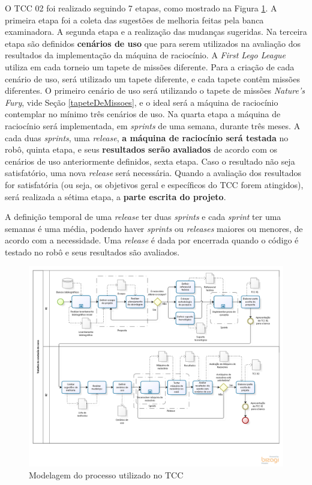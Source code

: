 O TCC 02 foi realizado seguindo 7 etapas, como mostrado na Figura \ref{modelagem}. A primeira etapa foi a coleta das sugestões de melhoria feitas pela banca examinadora. A segunda etapa e a realização das mudanças sugeridas. Na terceira etapa são definidos \textbf{cenários de uso} que para serem utilizados na avaliação dos resultados da implementação da máquina de raciocínio. 
A \textit{First Lego League} utiliza em cada torneio um tapete de missões diferente. Para a criação de cada cenário de uso, será utilizado um tapete diferente, e cada tapete contêm  missões diferentes. O primeiro cenário de uso será utilizando o tapete de missões \textit{Nature's Fury}, vide Seção \ref{tapeteDeMissoes}, e o ideal será a máquina de raciocínio contemplar no mínimo três cenários de uso.
Na quarta etapa a máquina de raciocínio será implementada, em \textit{sprints} de uma semana, durante três meses. A cada duas \textit{sprints}, uma \textit{release}, \textbf{a máquina de raciocínio será testada} no robô, quinta etapa, e seus\textbf{ resultados serão avaliados} de acordo com os cenários de uso anteriormente definidos, sexta etapa. Caso o resultado não seja satisfatório, uma nova \textit{release} será necessária. Quando a avaliação dos resultados for satisfatória (ou seja, os objetivos geral e específicos do TCC forem atingidos), será realizada a sétima etapa, a \textbf{parte escrita do projeto}.

A definição temporal de uma \textit{release} ter duas \textit{sprints} e cada \textit{sprint} ter uma semanas é uma média, podendo haver \textit{sprints} ou \textit{releases} maiores ou menores, de acordo com a necessidade. Uma \textit{release} é dada por encerrada quando o código é testado no robô e seus resultados são avaliados. 


\FloatBarrier
\begin{figure}[!h]
\includegraphics[angle=270,keepaspectratio=true,scale=0.7]{figuras/modelagemTcc.png}
\caption{Modelagem do processo utilizado no TCC}
\label{modelagem}
\end{figure}
\clearpage
 
